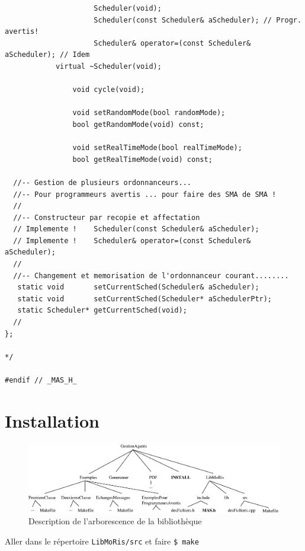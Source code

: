 \documentclass[12pt]{article}
\begin{document}
\begin{footnotesize}
\begin{verbatim}
                     Scheduler(void);
                     Scheduler(const Scheduler& aScheduler); // Progr. avertis!
                     Scheduler& operator=(const Scheduler& aScheduler); // Idem
            virtual ~Scheduler(void);

                void cycle(void);

                void setRandomMode(bool randomMode);
                bool getRandomMode(void) const;

                void setRealTimeMode(bool realTimeMode);
                bool getRealTimeMode(void) const;

  //-- Gestion de plusieurs ordonnanceurs...
  //-- Pour programmeurs avertis ... pour faire des SMA de SMA !
  //
  //-- Constructeur par recopie et affectation
  // Implemente !    Scheduler(const Scheduler& aScheduler);
  // Implemente !    Scheduler& operator=(const Scheduler& aScheduler);
  //
  //-- Changement et memorisation de l'ordonnanceur courant........
   static void       setCurrentSched(Scheduler& aScheduler);
   static void       setCurrentSched(Scheduler* aSchedulerPtr);
   static Scheduler* getCurrentSched(void);
  //
};

*/

#endif // _MAS_H_
\end{verbatim}
\end{footnotesize}
\fi

\newpage

\section{Installation}

\vspace{1cm}

\begin{figure}[hbtp]
\begin{center}
\includegraphics[width=15.5cm]{fig/arbo}
\end{center}
\caption{Description de l'arborescence de la biblioth\`eque}
\end{figure}

Aller dans le r\'epertoire {\tt LibMoRis/src}
et faire {\tt \$ make}
\end{document}

